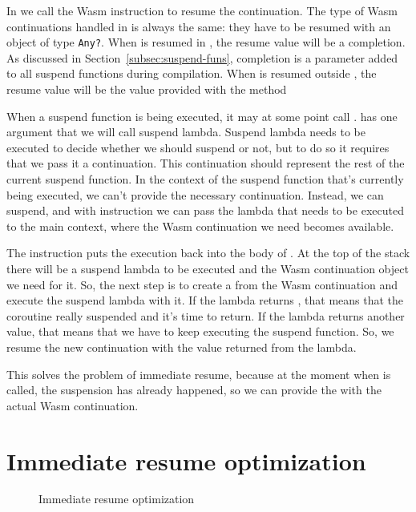 In \doResume we call the Wasm instruction to resume the continuation. The type of Wasm continuations handled
in \WasmContinuation is always the same: they have to be resumed with an object of type \texttt{Any?}.
When \WasmContinuation is resumed in \startCoroutineUninterceptedOrReturn, the resume value
will be a completion. As discussed in Section~\ref{subsec:suspend-funs}, completion is a parameter added
to all suspend functions during compilation. When \WasmContinuation is resumed outside
\startCoroutineUninterceptedOrReturn, the resume value will be the value provided with the method
\resumeWith

When a suspend function is being executed, it may at some point call \suspendCoroutineUninterceptedOrReturn.
\suspendCoroutineUninterceptedOrReturn has one argument that we will call suspend lambda. Suspend lambda needs to be
executed to decide whether we should suspend or not, but to do so it requires that we pass it a continuation.
This continuation should represent the rest of the current suspend function. In the context of the suspend function
that's currently being executed, we can't provide the necessary continuation. Instead, we can suspend, and with
\wasmsuspend instruction we can pass the lambda that needs to be executed to the main context, where the Wasm
continuation we need becomes available.

The \wasmsuspend instruction puts the execution back into the body of \doResume. At the top of the stack there will be
a suspend lambda to be executed and the Wasm continuation object we need for it. So, the next step is to create a
\WasmContinuation from the Wasm continuation and execute the suspend lambda with it. If the lambda returns
\COROUTINESUSPENDED, that means that the coroutine really suspended and it's time to return. If the lambda returns
another value, that means that we have to keep executing the suspend function. So, we resume the new continuation with
the value returned from the lambda.

This solves the problem of immediate resume, because at the moment when  is called,
the suspension has already happened, so we can provide the  with the actual Wasm continuation.

\section{Immediate resume optimization}
\label{sec:optimization}

\begin{figure}[H]
    \centering
    \resizebox{\textwidth}{!}{}
    \caption{Immediate resume optimization}
    \label{fig:optimization-impl}
\end{figure}

